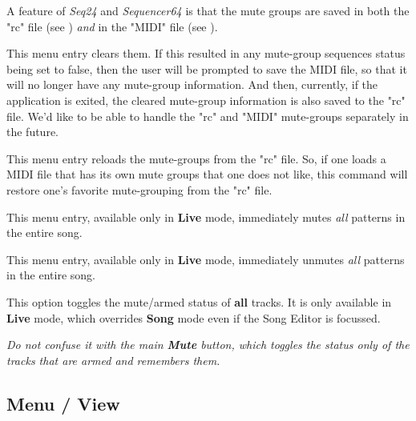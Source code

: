 
   A feature of \textsl{Seq24} and \textsl{Sequencer64} is that the mute groups
   are saved in both the "rc" file
   (see )
   \textsl{and} in the "MIDI" file
   (see ).

   This menu entry clears them. If this resulted in any mute-group sequences
   status being set to false, then the user will be prompted to save the MIDI
   file, so that it will no longer have any
   mute-group information.  And then, currently, if the
   application is exited, the cleared mute-group information is also saved to
   the "rc" file.  We'd like to be able to handle the "rc" and "MIDI"
   mute-groups separately in the future.


   This menu entry reloads the mute-groups from the "rc" file.
   So, if one loads a MIDI file that has its own mute groups that one does not
   like, this command will restore one's favorite mute-grouping from the "rc"
   file.


   This menu entry, available only in \textbf{Live} mode,
   immediately mutes \textsl{all} patterns in the entire song.


   This menu entry, available only in \textbf{Live} mode,
   immediately unmutes \textsl{all} patterns in the entire song.


   This option toggles the mute/armed status of \textbf{all} tracks.
   It is only available in \textbf{Live} mode, which overrides \textbf{Song}
   mode even if the Song Editor is focussed.

   \textsl{Do not confuse it with the main \textbf{Mute} button, which toggles the
   status only of the tracks that are armed and remembers them.}

\subsection{Menu / View}
\label{subsec:seq64_menu_view}

